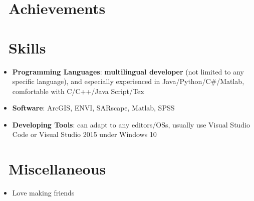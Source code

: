 \documentclass{resume}
\begin{document}
\section{\faHeartO\ Achievements}

\section{\faCogs\ Skills}
\begin{itemize}[parsep=0.25ex]
  \item \textbf{Programming Languages}:
    \textbf{multilingual developer} (not limited to any specific language),
    and especially experienced in Java/Python/C\#/Matlab,
    comfortable with C/C++/Java Script/Tex

  \item \textbf{Software}:
    ArcGIS, ENVI, SARscape, Matlab, SPSS
  
  \item \textbf{Developing Tools}:
    can adapt to any editors/OSs, usually use Visual Studio Code or Visual Studio 2015 under Windows 10
\end{itemize}


\section{\faInfo\ Miscellaneous}
\begin{itemize}[parsep=0.25ex]
  \item Love making friends
\end{itemize}

%
%
\end{document}
